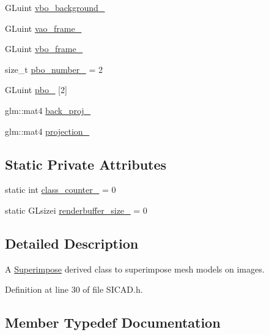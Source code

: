 \begin{DoxyCompactItemize}
G\+Luint \mbox{\hyperlink{classSICAD_a86d6184b8c557460317a158e8d9508d1}{vbo\+\_\+background\+\_\+}}
\item 
G\+Luint \mbox{\hyperlink{classSICAD_ae91abeb0fe30f27e0fc40649235f3437}{vao\+\_\+frame\+\_\+}}
\item 
G\+Luint \mbox{\hyperlink{classSICAD_af58ffe3edf622ab96f669fcd6e210be9}{vbo\+\_\+frame\+\_\+}}
\item 
size\+\_\+t \mbox{\hyperlink{classSICAD_a3d7e1e1b3049508ea3c40b85541ea818}{pbo\+\_\+number\+\_\+}} = 2
\item 
G\+Luint \mbox{\hyperlink{classSICAD_a56b765675245d3b4501cfda799d4630a}{pbo\+\_\+}} \mbox{[}2\mbox{]}
\item 
glm\+::mat4 \mbox{\hyperlink{classSICAD_ad5945f84df0d90113a24b2001ecbc832}{back\+\_\+proj\+\_\+}}
\item 
glm\+::mat4 \mbox{\hyperlink{classSICAD_afb91b682fd1f6629f163ab321869e7e0}{projection\+\_\+}}
\end{DoxyCompactItemize}
\subsection*{Static Private Attributes}
\begin{DoxyCompactItemize}
\item 
static int \mbox{\hyperlink{classSICAD_a16f7c3c77ddea5ba57bbcbcdd7a8d125}{class\+\_\+counter\+\_\+}} = 0
\item 
static G\+Lsizei \mbox{\hyperlink{classSICAD_aca24504d58ce97106dbc95925f36fca0}{renderbuffer\+\_\+size\+\_\+}} = 0
\end{DoxyCompactItemize}


\subsection{Detailed Description}
A \mbox{\hyperlink{classSuperimpose}{Superimpose}} derived class to superimpose mesh models on images. 

Definition at line 30 of file S\+I\+C\+A\+D.\+h.



\subsection{Member Typedef Documentation}
\mbox{\label{classSICAD_aca3c9693d298f2e8dc171194c6a7507c}} 
